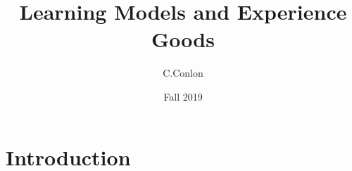 \def\beamerclassoptions{[xcolor=pdftex,dvipsnames,table,mathserif,aspectratio=169]}


\usepackage[english]{babel}
\usepackage{pgf,pgfarrows,pgfnodes,pgfautomata,pgfheaps}
\usepackage{amsmath,amssymb,setspace,centernot}
\usepackage[latin1]{inputenc}
\usepackage[T1]{fontenc}
\usepackage{relsize}
\usepackage{pdfpages}
\usepackage[absolute,overlay]{textpos} 





\title [Dynamic Demand I]{Learning Models and Experience Goods}
\author{C.Conlon}
\date{Fall 2019}


\begin{frame}
\titlepage
\end{frame}



\section*{Introduction}



